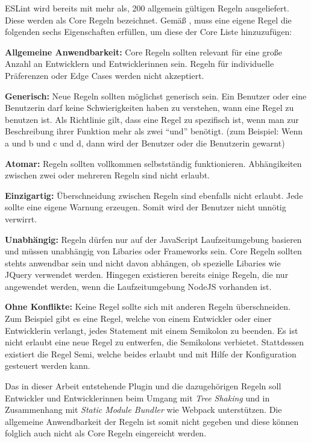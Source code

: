 ESLint wird bereits mit mehr als, 200 allgemein gültigen Regeln ausgeliefert. Diese werden als Core Regeln bezeichnet. Gemäß \autocite{ESLintNewRules}, muss eine eigene Regel die folgenden sechs Eigenschaften erfüllen, um diese der Core Liste hinzuzufügen:

\textbf{Allgemeine Anwendbarkeit:}
Core Regeln sollten relevant für eine große Anzahl an Entwicklern und Entwicklerinnen sein. Regeln für individuelle Präferenzen oder Edge Cases werden nicht akzeptiert.

\textbf{Generisch:}
Neue Regeln sollten möglichst generisch sein. Ein Benutzer oder eine Benutzerin darf keine Schwierigkeiten haben zu verstehen, wann eine Regel zu benutzen ist. Als Richtlinie gilt, dass eine Regel zu spezifisch ist, wenn man zur Beschreibung ihrer Funktion mehr als zwei ``und'' benötigt. (zum Beispiel: Wenn a und b und c und d, dann wird der Benutzer oder die Benutzerin gewarnt)

\textbf{Atomar:}
Regeln sollten vollkommen selbstständig funktionieren. Abhängikeiten zwischen zwei oder mehreren Regeln sind nicht erlaubt.

\textbf{Einzigartig:}
Überschneidung zwischen Regeln sind ebenfalls nicht erlaubt. Jede sollte eine eigene Warnung erzeugen. Somit wird der Benutzer nicht unnötig verwirrt.

\textbf{Unabhängig:}
Regeln dürfen nur auf der JavaScript Laufzeitumgebung basieren und müssen unabhängig von Libaries oder Frameworks sein. Core Regeln sollten stehts anwendbar sein und nicht davon abhängen, ob spezielle Libaries wie JQuery verwendet werden. Hingegen existieren bereits einige Regeln, die nur angewendet werden, wenn die Laufzeitumgebung NodeJS vorhanden ist.

\textbf{Ohne Konflikte:}
Keine Regel sollte sich mit anderen Regeln überschneiden. Zum Beispiel gibt es eine Regel, welche von einem Entwickler oder einer Entwicklerin verlangt, jedes Statement mit einem Semikolon zu beenden. Es ist nicht erlaubt eine neue Regel zu entwerfen, die Semikolons verbietet. Stattdessen existiert die Regel Semi, welche beides erlaubt und mit Hilfe der Konfiguration gesteuert werden kann.

Das in dieser Arbeit entstehende Plugin und die dazugehörigen Regeln soll Entwickler und Entwicklerinnen beim Umgang mit \textit{Tree Shaking} und in Zusammenhang mit \textit{Static Module Bundler} wie Webpack unterstützen. Die allgemeine Anwendbarkeit der Regeln ist somit nicht gegeben und diese können folglich auch nicht als Core Regeln eingereicht werden.


